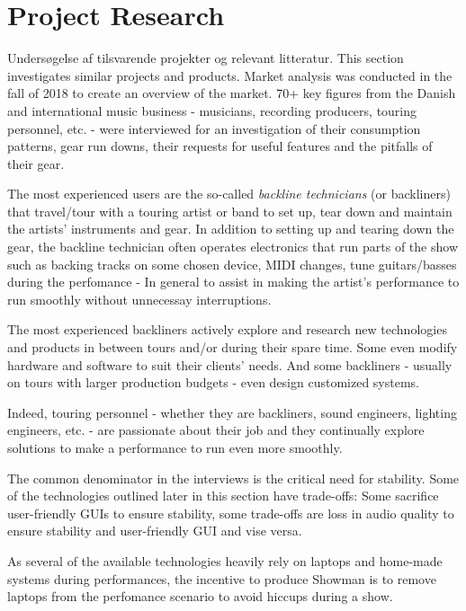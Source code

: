 \chapter{Project Research}
Undersøgelse af tilsvarende projekter og relevant litteratur.
This section investigates similar projects and products. Market analysis was conducted in the fall of 2018 to create an overview of the market. 70+ key figures from the Danish and international music business - musicians, recording producers, touring personnel, etc. - were interviewed for an investigation of their consumption patterns, gear run downs, their requests for useful features and the pitfalls of their gear. \newline

The most experienced users are the so-called \textit{backline technicians} (or backliners) that travel/tour with a touring artist or band to set up, tear down and maintain the artists' instruments and gear. In addition to setting up and tearing down the gear, the backline technician often operates electronics that run parts of the show such as backing tracks on some chosen device, MIDI changes, tune guitars/basses during the perfomance - In general to assist in making the artist's performance to run smoothly without unnecessay interruptions. \newline

The most experienced backliners actively explore and research new technologies and products in between tours and/or during their spare time. Some even modify hardware and software to suit their clients' needs. And some backliners - usually on tours with larger production budgets - even design customized systems. \newline

Indeed, touring personnel - whether they are backliners, sound engineers, lighting engineers, etc. - are passionate about their job and they continually explore solutions to make a performance to run even more smoothly. \newline

The common denominator in the interviews is the critical need for stability. Some of the technologies outlined later in this section have trade-offs: Some sacrifice user-friendly GUIs to ensure stability, some trade-offs are loss in audio quality to ensure stability and user-friendly GUI and vise versa. \newline

As several of the available technologies heavily rely on laptops and home-made systems during performances, the incentive to produce Showman is to remove laptops from the perfomance scenario to avoid hiccups during a show. \newline

